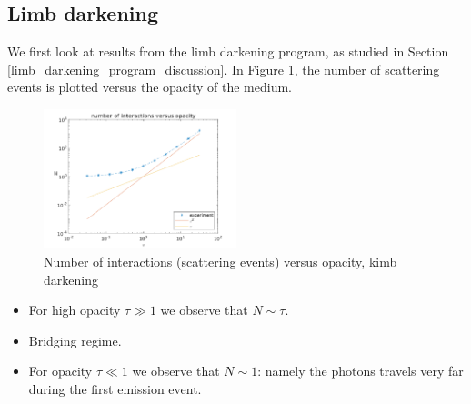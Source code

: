 \documentclass[../main/main.tex]{subfiles}
\begin{document}
\newpage
\subsection{Limb darkening} We first look at results from the limb darkening program, as studied in Section \ref{limb_darkening_program_discussion}. In Figure \ref{limb_darkening_N_vs_tau}, the number of scattering events is plotted versus the opacity of the medium. 

	\begin{figure}[!htp]
	\centering
	\includegraphics[width=0.5\textwidth]{../../introductory_exercises/limb_darkening/data/N_vs_opacity.png}
	\caption{Number of interactions (scattering events) versus 	opacity, kimb darkening}
	\label{limb_darkening_N_vs_tau}
	\end{figure}

\begin{itemize}
\item For high opacity $\tau \gg 1$ we observe that $N \sim \tau$. \item Bridging regime.
\item For opacity $\tau \ll 1$ we observe that $N \sim 1$: namely the photons travels very far during the first emission event.
\end{itemize}


\noindent{}
\end{document}
